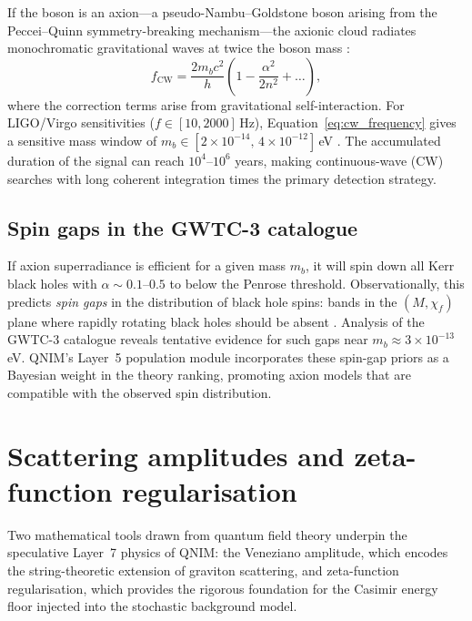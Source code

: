 \documentclass[11pt,a4paper, english]{book}
\theoremstyle{plain}
\theoremstyle{definition}
\numberwithin{equation}{chapter}
\numberwithin{figure}{chapter}
\numberwithin{table}{chapter}
\begin{document}
If the boson is an axion---a pseudo-Nambu--Goldstone boson arising from the Peccei--Quinn symmetry-breaking mechanism---the axionic cloud radiates monochromatic gravitational waves at twice the boson mass \cite{Brito_2015}:
\begin{equation}
  \label{eq:cw_frequency}
  f_\mathrm{CW} = \frac{2 m_b c^2}{h}
    \left(1 - \frac{\alpha^2}{2n^2} + \ldots\right),
\end{equation}
where the correction terms arise from gravitational self-interaction. For LIGO/Virgo sensitivities ($f \in [10, 2000]$\,Hz), Equation~\eqref{eq:cw_frequency}
gives a sensitive mass window of $m_b \in [2\times10^{-14},\,4\times10^{-12}]$\,eV
\cite{Brito_2015}. The accumulated duration of the signal can reach $10^4$--$10^6$ years, making continuous-wave (CW) searches with long coherent integration times the primary detection strategy.

\subsection{Spin gaps in the GWTC-3 catalogue}
\label{app:subsec:spin-gaps}

If axion superradiance is efficient for a given mass $m_b$, it will spin down all Kerr black holes with $\alpha \sim 0.1$--$0.5$ to below the Penrose threshold. Observationally, this predicts \emph{spin gaps} in the distribution of black hole spins: bands in the $(M, \chi_f)$ plane where rapidly rotating black holes should be absent \cite{Arvanitaki_2011}. Analysis of the GWTC-3 catalogue reveals tentative evidence for such gaps near $m_b \approx 3\times10^{-13}$\,eV. QNIM's Layer~5 population module incorporates these spin-gap priors as a Bayesian weight in the theory ranking, promoting axion models that are compatible with the observed spin distribution.

\section{Scattering amplitudes and zeta-function regularisation}
\label{app:sec:amplitudes-zeta}
Two mathematical tools drawn from quantum field theory underpin the speculative Layer~7 physics of QNIM: the Veneziano amplitude, which encodes the string-theoretic extension of graviton scattering, and zeta-function regularisation, which provides the rigorous foundation for the Casimir energy floor injected into the stochastic background model.
\end{document}
